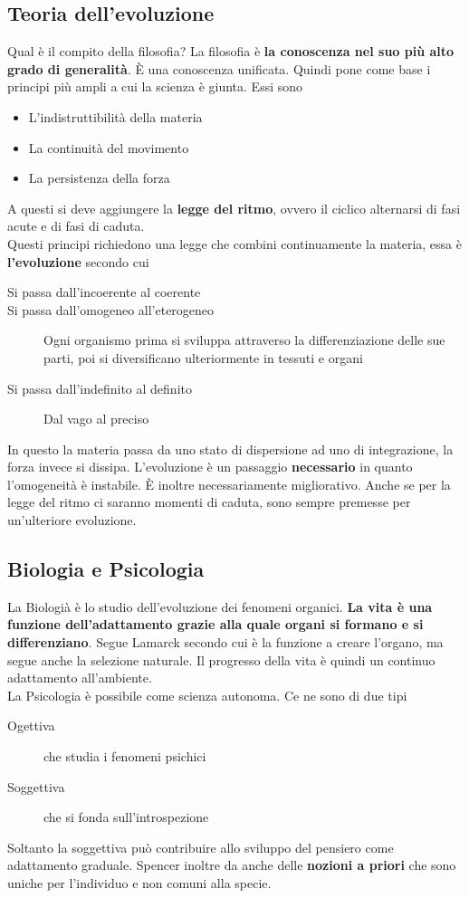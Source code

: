 \subsection{Teoria dell'evoluzione}
Qual è il compito della filosofia? La filosofia è \textbf{la conoscenza nel suo più alto grado di 
generalità}. È una conoscenza unificata. Quindi pone come base i principi più ampli a cui la scienza
è giunta. Essi sono
\begin{itemize}
  \item L'indistruttibilità della materia
  \item La continuità del movimento
  \item La persistenza della forza
\end{itemize}
A questi si deve aggiungere la \textbf{legge del ritmo}, ovvero il ciclico alternarsi di fasi acute e
di fasi di caduta.\\
Questi principi richiedono una legge che combini continuamente la materia, essa è 
\textbf{l'evoluzione} secondo cui
\begin{description}
  \item[Si passa dall'incoerente al coerente]
  \item[Si passa dall'omogeneo all'eterogeneo] Ogni organismo prima si sviluppa attraverso la 
    differenziazione delle sue parti, poi si diversificano ulteriormente in tessuti e organi
  \item[Si passa dall'indefinito al definito] Dal vago al preciso
\end{description}
In questo la materia passa da uno stato di dispersione ad uno di integrazione, la forza invece si 
dissipa. L'evoluzione è un passaggio \textbf{necessario} in quanto l'omogeneità è instabile. È 
inoltre necessariamente migliorativo. Anche se per la legge del ritmo ci saranno momenti di
caduta, sono sempre premesse per un'ulteriore evoluzione.

\subsection{Biologia e Psicologia}
La Biologià è lo studio dell'evoluzione dei fenomeni organici. \textbf{La vita è una funzione 
dell'adattamento grazie alla quale organi si formano e si differenziano}. Segue Lamarck secondo cui è
la funzione a creare l'organo, ma segue anche la selezione naturale. Il progresso della vita è
quindi un continuo adattamento all'ambiente.\\ [\baselineskip]
La Psicologia è possibile come scienza autonoma. Ce ne sono di due tipi
\begin{description}
  \item[Ogettiva] che studia i fenomeni psichici
  \item[Soggettiva] che si fonda sull'introspezione
\end{description}
Soltanto la soggettiva può contribuire allo sviluppo del pensiero come adattamento graduale. Spencer
inoltre da anche delle \textbf{nozioni a priori} che sono uniche per l'individuo e non comuni alla
specie.

